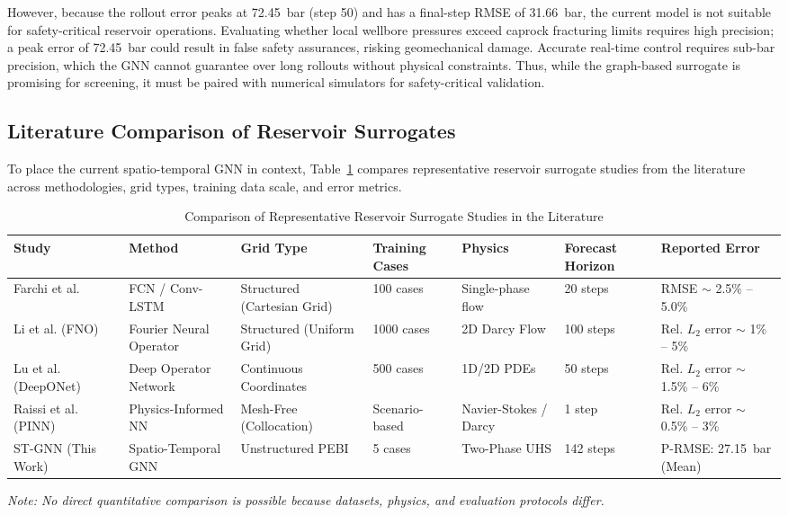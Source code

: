\documentclass[10pt,twocolumn]{article}
\begin{document}
However, because the rollout error peaks at 72.45~bar (step 50) and has a final-step RMSE of 31.66~bar, the current model is not suitable for safety-critical reservoir operations. Evaluating whether local wellbore pressures exceed caprock fracturing limits requires high precision; a peak error of 72.45~bar could result in false safety assurances, risking geomechanical damage. Accurate real-time control requires sub-bar precision, which the GNN cannot guarantee over long rollouts without physical constraints. Thus, while the graph-based surrogate is promising for screening, it must be paired with numerical simulators for safety-critical validation.

\subsection{Literature Comparison of Reservoir Surrogates}
To place the current spatio-temporal GNN in context, Table~\ref{tab:lit_comparison} compares representative reservoir surrogate studies from the literature across methodologies, grid types, training data scale, and error metrics.

\begin{table}[htbp]
\centering
\caption{Comparison of Representative Reservoir Surrogate Studies in the Literature}
\label{tab:lit_comparison}
\begin{tabularx}{\textwidth}{lXXXXXX}
\toprule
\textbf{Study} & \textbf{Method} & \textbf{Grid Type} & \textbf{Training Cases} & \textbf{Physics} & \textbf{Forecast Horizon} & \textbf{Reported Error} \\
\midrule
Farchi et al.~\cite{farchi2021} & FCN / Conv-LSTM & Structured (Cartesian Grid) & 100 cases & Single-phase flow & 20 steps & RMSE $\sim$ 2.5\% -- 5.0\% \\
Li et al. (FNO)~\cite{li2020fno} & Fourier Neural Operator & Structured (Uniform Grid) & 1000 cases & 2D Darcy Flow & 100 steps & Rel. $L_2$ error $\sim$ 1\% -- 5\% \\
Lu et al. (DeepONet)~\cite{lu2021deeponet} & Deep Operator Network & Continuous Coordinates & 500 cases & 1D/2D PDEs & 50 steps & Rel. $L_2$ error $\sim$ 1.5\% -- 6\% \\
Raissi et al. (PINN)~\cite{raissi2019pinn} & Physics-Informed NN & Mesh-Free (Collocation) & Scenario-based & Navier-Stokes / Darcy & 1 step & Rel. $L_2$ error $\sim$ 0.5\% -- 3\% \\
ST-GNN (This Work) & Spatio-Temporal GNN & Unstructured PEBI & 5 cases & Two-Phase UHS & 142 steps & P-RMSE: 27.15~bar (Mean) \\
\bottomrule
\end{tabularx}
\begin{flushleft}
\small \textit{Note: No direct quantitative comparison is possible because datasets, physics, and evaluation protocols differ.}
\end{flushleft}
\end{table}
\end{document}
